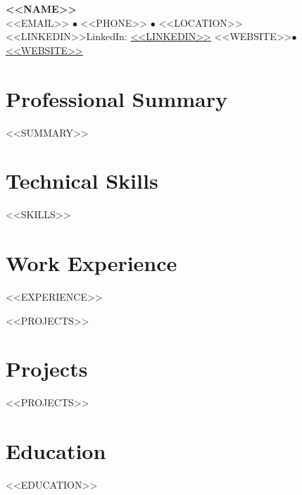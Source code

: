 \documentclass[<<FONT_SIZE>>,a4paper]{article}
\begin{document}
\begin{center}
    {\Huge\bfseries\color{headercolor} <<NAME>>} \\[0.5em]
    <<EMAIL>> $\bullet$ <<PHONE>> $\bullet$ <<LOCATION>> \\
    \ifx\empty<<LINKEDIN>>\empty\else LinkedIn: \href{https://linkedin.com/in/<<LINKEDIN>>}{<<LINKEDIN>>} \fi
    \ifx\empty<<WEBSITE>>\empty\else $\bullet$ \href{<<WEBSITE>>}{<<WEBSITE>>} \fi
\end{center}

\vspace{1em}

\section{Professional Summary}
<<SUMMARY>>

\section{Technical Skills}
<<SKILLS>>

\section{Work Experience}
<<EXPERIENCE>>

\ifx\empty<<PROJECTS>>\empty
\else
\section{Projects}
<<PROJECTS>>
\fi

\section{Education}
<<EDUCATION>>
\end{document}
